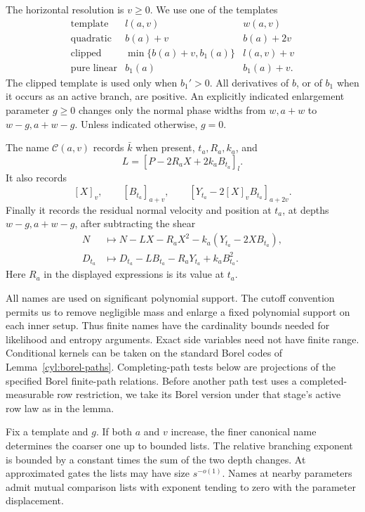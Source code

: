 The horizontal resolution is \(v\geq0\). We use one of the templates
\[
\begin{array}{c|c|c}
 \text{template}&l(a,v)&w(a,v)\\ \hline
 \text{quadratic}&b(a)+v&b(a)+2v\\
 \text{clipped}&\min\{b(a)+v,b_1(a)\}&l(a,v)+v\\
 \text{pure linear}&b_1(a)&b_1(a)+v.
\end{array}
\]
The clipped template is used only when \(b_1'>0\). All derivatives of
\(b\), or of \(b_1\) when it occurs as an active branch, are positive.
An explicitly indicated enlargement parameter \(g\geq0\) changes only
the normal phase widths from \(w,a+w\) to \(w-g,a+w-g\).
Unless indicated otherwise, \(g=0\).

\begin{definition}\label{names:canonical-name}
The name \(\mathcal C(a,v)\) records \(\bar k\) when present,
\(t_a,R_a,k_a\), and
\[
 L=[P-2R_aX+2k_aB_{t_a}]_l.
\]
It also records
\[
 [X]_v,\qquad [B_{t_a}]_{a+v},\qquad
 [Y_{t_a}-2[X]_vB_{t_a}]_{a+2v}.
\]
Finally it records the residual normal velocity and position at \(t_a\),
at depths \(w-g,a+w-g\), after subtracting the shear
\[
\begin{split}
 N&\longmapsto N-LX-R_aX^2-k_a(Y_{t_a}-2XB_{t_a}),\\
 D_{t_a}&\longmapsto D_{t_a}-LB_{t_a}-R_aY_{t_a}+k_aB_{t_a}^2.
\end{split}
\]
Here \(R_a\) in the displayed expressions is its value at \(t_a\).
\end{definition}

All names are used on significant polynomial support. The cutoff
convention permits us to remove negligible mass and enlarge a fixed
polynomial support on each inner setup. Thus finite names have the
cardinality bounds needed for likelihood and entropy arguments. Exact
side variables need not have finite range. Conditional kernels can be
taken on the standard Borel codes of
Lemma~\ref{cyl:borel-paths}. Completing-path tests below are
projections of the specified Borel finite-path relations. Before
another path test uses a completed-measurable row restriction, we
take its Borel version under that stage's active row law as in the
lemma.

\begin{lemma}\label{names:refinement}
Fix a template and \(g\). If both \(a\) and \(v\) increase, the finer
canonical name determines the coarser one up to bounded lists. The
relative branching exponent is bounded by a constant times the sum of
the two depth changes. At approximated gates the lists may have size
\(s^{-o(1)}\). Names at nearby parameters admit mutual comparison
lists with exponent tending to zero with the parameter displacement.
\end{lemma}

